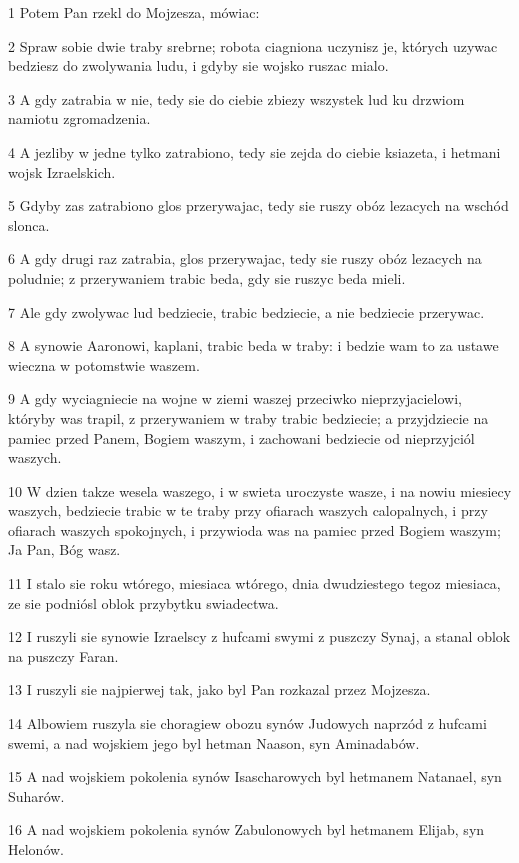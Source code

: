 \par 1 Potem Pan rzekl do Mojzesza, mówiac:
\par 2 Spraw sobie dwie traby srebrne; robota ciagniona uczynisz je, których uzywac bedziesz do zwolywania ludu, i gdyby sie wojsko ruszac mialo.
\par 3 A gdy zatrabia w nie, tedy sie do ciebie zbiezy wszystek lud ku drzwiom namiotu zgromadzenia.
\par 4 A jezliby w jedne tylko zatrabiono, tedy sie zejda do ciebie ksiazeta, i hetmani wojsk Izraelskich.
\par 5 Gdyby zas zatrabiono glos przerywajac, tedy sie ruszy obóz lezacych na wschód slonca.
\par 6 A gdy drugi raz zatrabia, glos przerywajac, tedy sie ruszy obóz lezacych na poludnie; z przerywaniem trabic beda, gdy sie ruszyc beda mieli.
\par 7 Ale gdy zwolywac lud bedziecie, trabic bedziecie, a nie bedziecie przerywac.
\par 8 A synowie Aaronowi, kaplani, trabic beda w traby: i bedzie wam to za ustawe wieczna w potomstwie waszem.
\par 9 A gdy wyciagniecie na wojne w ziemi waszej przeciwko nieprzyjacielowi, któryby was trapil, z przerywaniem w traby trabic bedziecie; a przyjdziecie na pamiec przed Panem, Bogiem waszym, i zachowani bedziecie od nieprzyjciól waszych.
\par 10 W dzien takze wesela waszego, i w swieta uroczyste wasze, i na nowiu miesiecy waszych, bedziecie trabic w te traby przy ofiarach waszych calopalnych, i przy ofiarach waszych spokojnych, i przywioda was na pamiec przed Bogiem waszym; Ja Pan, Bóg wasz.
\par 11 I stalo sie roku wtórego, miesiaca wtórego, dnia dwudziestego tegoz miesiaca, ze sie podniósl oblok przybytku swiadectwa.
\par 12 I ruszyli sie synowie Izraelscy z hufcami swymi z puszczy Synaj, a stanal oblok na puszczy Faran.
\par 13 I ruszyli sie najpierwej tak, jako byl Pan rozkazal przez Mojzesza.
\par 14 Albowiem ruszyla sie choragiew obozu synów Judowych naprzód z hufcami swemi, a nad wojskiem jego byl hetman Naason, syn Aminadabów.
\par 15 A nad wojskiem pokolenia synów Isascharowych byl hetmanem Natanael, syn Suharów.
\par 16 A nad wojskiem pokolenia synów Zabulonowych byl hetmanem Elijab, syn Helonów.
